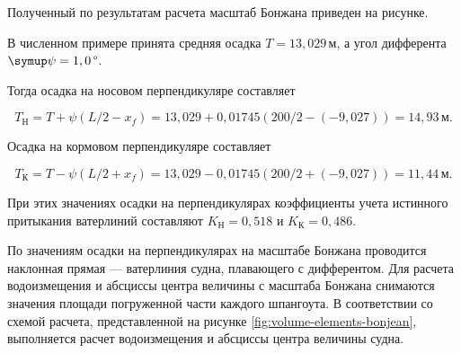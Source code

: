 Полученный по результатам расчета масштаб Бонжана приведен на рисунке.

\begin{figure}[H]
    \centerline{}
    \caption{Масштаб Бонжана}
    \caption*{\textit{}}
\end{figure}

В численном примере принята средняя осадка $T = 13{,}029\,\text{м}$, а угол дифферента $\psi = 1,0\,\text{\textdegree}$.

Тогда осадка на носовом перпендикуляре составляет

\begin{equation*}
    T_{\text{Н}} = T + \psi (L/2 - x_f) = 13{,}029 + 0{,}01745 (200 / 2 - (-9{,}027)) = 14{,}93\,\text{м}.
\end{equation*}

Осадка на кормовом перпендикуляре составляет

\begin{equation*}
    T_{\text{К}} = T - \psi (L/2 + x_f) = 13{,}029 - 0{,}01745 (200 / 2 + (-9{,}027)) = 11{,}44\,\text{м}.
\end{equation*}

При этих значениях осадки на перпендикулярах коэффициенты учета истинного притыкания ватерлиний составляют $K_{\text{Н}} = 0{,}518$ и $K_{\text{К}} = 0{,}486$.

По значениям осадки на перпендикулярах на масштабе Бонжана проводится наклонная прямая --- ватерлиния судна, плавающего с дифферентом.
Для расчета водоизмещения и абсциссы центра величины с масштаба Бонжана снимаются значения площади погруженной части каждого шпангоута.
В соответствии со схемой расчета, представленной на рисунке \ref{fig:volume-elements-bonjean}, выполняется расчет водоизмещения и абсциссы центра величины судна.

